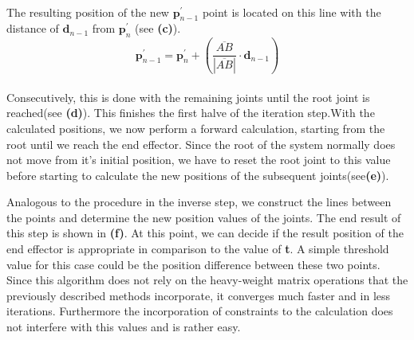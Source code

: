 \\The resulting position of the new $\textbf{p}_{n-1}^{'}$ point is located on this line with the distance of $\textbf{d}_{n-1}$ from $\textbf{p}_{n}^{'}$ (see \textbf{(c)}).\\
\begin{equation}
\textbf{p}_{n-1}^{'}= \textbf{p}_{n}^{'}+ \left(\frac{\overline{AB}}{|\overline{AB}|}\cdot\textbf{d}_{n-1}\right)
\end{equation}
\\Consecutively, this is done with the remaining joints until the root joint is reached(see \textbf{(d)}).
This finishes the first halve of the iteration step.With the calculated positions, we now perform a forward calculation, starting from the root until we reach the end effector. Since the root of the system normally does not move from it's initial position, we have to reset the root joint to this value before starting to calculate the new positions of the subsequent joints(see\textbf{(e)}).

Analogous to the procedure in the inverse step, we construct the lines between the points and determine the new position values of the joints. The end result of this step is shown in \textbf{(f)}. At this point, we can decide if the result position of the end effector is appropriate in comparison to the value of \textbf{t}. A simple threshold value for this case could be the position difference between these two points.
\\Since this algorithm does not rely on the heavy-weight matrix operations that the previously described methods incorporate, it converges much faster and in less iterations. Furthermore the incorporation of constraints to the calculation does not interfere with this values and is rather easy.